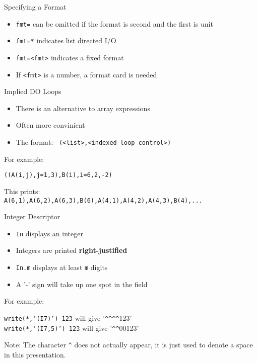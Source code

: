 \documentclass{beamer}
\begin{document}
\begin{frame}{Specifying a Format}

  \begin{itemize}
    \item \texttt{fmt=} can be omitted if the format is second and the first is unit
    \vfill\item \texttt{fmt=*} indicates list directed I/O
    \vfill\item \texttt{fmt=<fmt>} indicates a fixed format
    \vfill\item If \texttt{<fmt>} is a number, a format card is needed
  \end{itemize}

\end{frame}
\begin{frame}{Implied DO Loops}

  \begin{itemize}
    \item There is an alternative to array expressions
    \vfill\item Often more convinient
    \vfill\item The format: \texttt{ (<list>,<indexed loop control>) }
  \end{itemize}
  \vfill
  For example:
  \begin{center}
    \texttt{((A(i,j),j=1,3),B(i),i=6,2,-2)} \\
  \end{center}
  \vfill
  This prints: \\
  \texttt{A(6,1),A(6,2),A(6,3),B(6),A(4,1),A(4,2),A(4,3),B(4),...}

\end{frame}
\begin{frame}{Integer Descriptor}

  \begin{itemize}
    \item \texttt{In} displays an integer
    \vfill\item Integers are printed \textbf{right-justified}
    \vfill\item \texttt{In.m} displays at least \texttt{m} digits
    \vfill\item A '-' sign will take up one spot in the field
  \end{itemize}
  \vfill
  For example:
  \begin{center}
    \texttt{write(*,'(I7)') 123} will give  '\texttt{\^}\texttt{\^}\texttt{\^}\texttt{\^}123' \\
    \texttt{write(*,'(I7,5)') 123} will give '\texttt{\^}\texttt{\^}00123'
  \end{center}
  \vfill
  \alert{Note:} The character \texttt{\^} does not actually appear, it is just used to denote a space in this presentation.
\end{frame}
\end{document}
